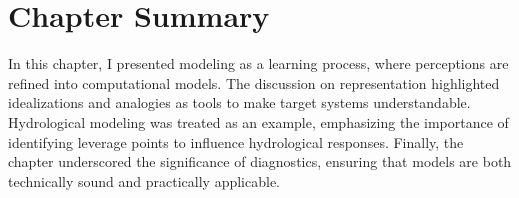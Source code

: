 \documentclass[./main_en.tex]{subfiles}
\begin{document}
\clearpage

\section{Chapter Summary} \label{sec:sys:summary}

\par In this chapter, I presented modeling as a learning process, where perceptions are refined into computational models. The discussion on representation highlighted idealizations and analogies as tools to make target systems understandable. Hydrological modeling was treated as an example, emphasizing the importance of identifying leverage points to influence hydrological responses. Finally, the chapter underscored the significance of diagnostics, ensuring that models are both technically sound and practically applicable.
\end{document}
